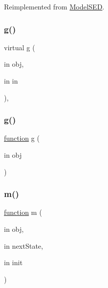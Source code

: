 Reimplemented from \hyperlink{class_model_s_e_d_ac36f9451c43b120828af4380858f2024}{Model\+S\+ED}.

\mbox{\label{class_model_s_e_d_a2d53b5f665cfcf64d482bbfa8a6eb098}} 
\subsubsection{\texorpdfstring{g()}{g()}\hspace{0.1cm}{\footnotesize\ttfamily [1/2]}}
{\footnotesize\ttfamily virtual g (\begin{DoxyParamCaption}\item[{in}]{obj,  }\item[{in}]{in }\end{DoxyParamCaption})\hspace{0.3cm}{\ttfamily [virtual]}, {\ttfamily [inherited]}}

\mbox{\label{class_model_pacman_a07dadfabe92bf9a144b8a862720e7746}} 
\subsubsection{\texorpdfstring{g()}{g()}\hspace{0.1cm}{\footnotesize\ttfamily [2/2]}}
{\footnotesize\ttfamily \hyperlink{_plan__desuma_functions__2_players_8m_ac2ffb26d6f42d3bbcd7847b0873403f4}{function} g (\begin{DoxyParamCaption}\item[{in}]{obj }\end{DoxyParamCaption})}

\mbox{\label{class_model_pacman_a3140f24c6c4b80037b7d4f521c6ae2d3}} 
\subsubsection{\texorpdfstring{m()}{m()}}
{\footnotesize\ttfamily \hyperlink{_plan__desuma_functions__2_players_8m_ac2ffb26d6f42d3bbcd7847b0873403f4}{function} m (\begin{DoxyParamCaption}\item[{in}]{obj,  }\item[{in}]{next\+State,  }\item[{in}]{init }\end{DoxyParamCaption})\hspace{0.3cm}{\ttfamily [virtual]}}



